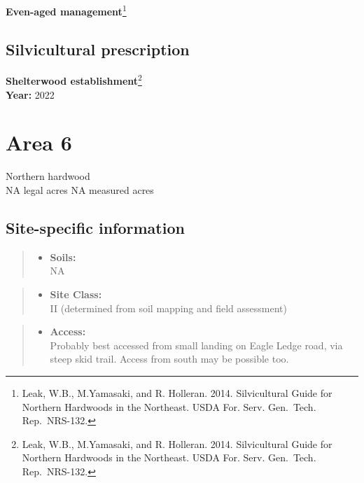 \documentclass[]{tufte-handout}
\providecommand{\tightlist}{%
  \setlength{\itemsep}{0pt}\setlength{\parskip}{0pt}}
\begin{document}
\textbf{Even-aged management}\footnote{Leak, W.B., M.Yamasaki, and R.
  Holleran. 2014. Silvicultural Guide for Northern Hardwoods in the
  Northeast. USDA For. Serv. Gen.~Tech. Rep.~NRS-132.}

\subsection{Silvicultural
prescription}\label{silvicultural-prescription-4}

\textbf{Shelterwood establishment}\footnote{Leak, W.B., M.Yamasaki, and
  R. Holleran. 2014. Silvicultural Guide for Northern Hardwoods in the
  Northeast. USDA For. Serv. Gen.~Tech. Rep.~NRS-132.}\\
\textbf{Year:} 2022

\newpage

\section{Area 6}\label{area-6}

Northern hardwood\\
\noindent NA legal acres \textbar{} NA measured acres

\subsection{Site-specific
information}\label{site-specific-information-5}

\begin{quote}
\begin{itemize}
\tightlist
\item
  \textbf{Soils:}\\
  \indent\indent  NA
\end{itemize}
\end{quote}

\begin{quote}
\begin{itemize}
\tightlist
\item
  \textbf{Site Class:}\\
  \vspace{2pt} II (determined from soil mapping and field assessment)
\end{itemize}
\end{quote}

\begin{quote}
\begin{itemize}
\tightlist
\item
  \textbf{Access:}\\
  \vspace{2pt} Probably best accessed from small landing on Eagle Ledge
  road, via steep skid trail. Access from south may be possible too.
\end{itemize}
\end{quote}
\end{document}
